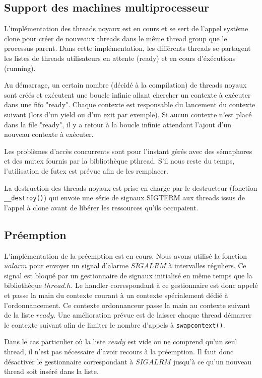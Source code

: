 \subsection{Support des machines multiprocesseur}

L'implémentation des threads noyaux est en cours et se sert de l'appel système clone pour créer de nouveaux threads dans le même thread group que le processus parent. Dans cette implémentation, les différents threads se partagent les listes de threads utilisateurs en attente (ready) et en cours d'éxécutions (running).

Au démarrage, un certain nombre (décidé à la compilation) de threads noyaux sont créés et exécutent une boucle infinie allant chercher un contexte à exécuter dans une fifo "ready". Chaque contexte est responsable du lancement du contexte suivant (lors d'un yield ou d'un exit par exemple). Si aucun contexte n'est placé dans la file "ready", il y a retour à la boucle infinie attendant l'ajout d'un nouveau contexte à exécuter.

Les problèmes d'accès concurrents sont pour l'instant gérés avec des sémaphores et des mutex fournis par la bibliothèque pthread. S'il nous reste du temps, l'utilisation de futex est prévue afin de les remplacer.

La destruction des threads noyaux est prise en charge par le destructeur (fonction \verb!__destroy()!) qui envoie une série de signaux SIGTERM aux threads issus de l'appel à clone avant de libérer les ressources qu'ils occupaient.


\subsection{Préemption}
L'implémentation de la préemption est en cours. Nous avons utilisé la fonction $ualarm$ pour envoyer un signal d'alarme $SIGALRM$ à intervalles réguliers. Ce signal est bloqué par un gestionnaire de signaux initialisé en même temps que la bibliothèque $thread.h$. Le handler correspondant à ce gestionnaire est donc appelé et passe la main du contexte courant à un contexte spécialement dédié à l'ordonnancement. Ce contexte ordonnanceur passe la main au contexte suivant de la liste $ready$. Une amélioration prévue est de laisser chaque thread démarrer le contexte suivant afin de limiter le nombre d'appels à \verb!swapcontext()!.

Dans le cas particulier où la liste $ready$ est vide ou ne comprend qu'un seul thread, il n'est pas nécessaire d'avoir recours à la préemption. Il faut donc désactiver le gestionnaire correspondant à $SIGALRM$ jusqu'à ce qu'un nouveau thread soit inséré dans la liste.

